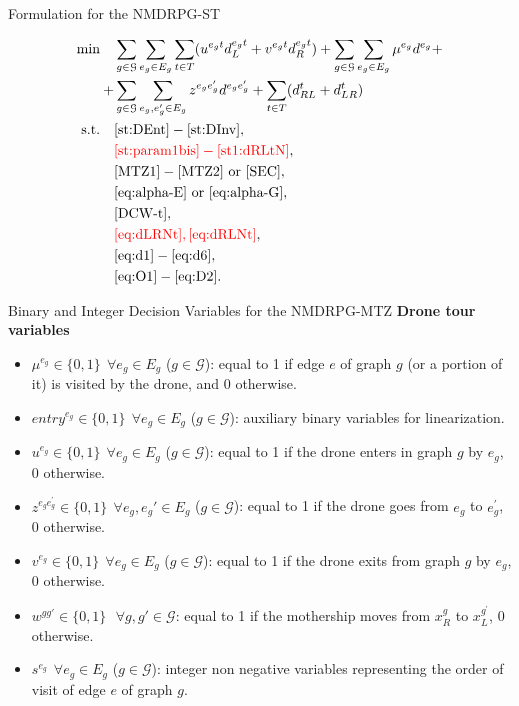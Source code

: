 \documentclass[slidestop,usepdftitle=false,10pt]{beamer}
\begin{document}
	\begin{frame}{Formulation for the NMDRPG-ST}
	
	\begin{align*}
	    \text{min}\quad &\sum_{g\in\mathcal G}\sum_{e_g\in E_g}\sum_{t\in T} (u^{e_gt}d_L^{e_gt} + v^{e_gt}d_R^{e_gt}) + \sum_{g\in\mathcal G}\sum_{e_g\in E_g} \mu^{e_g}d^{e_g} + \\
	    + & \sum_{g\in\mathcal G}\sum_{e_g,e^\prime_g\in E_g}z^{e_ge^\prime_g}d^{e_ge^\prime_g} + \sum_{t\in T} (d_{RL}^t + d_{LR}^t) \\
	    \text{s.t.}\quad & \eqref{st:DEnt}-\eqref{st:DInv}, \\
	    & \textcolor{red}{\eqref{st:param1bis}-\eqref{st1:dRLtN}}, \\
	    & \eqref{MTZ1} - \eqref{MTZ2} \text{ or } \eqref{SEC}, \\
	    & \eqref{eq:alpha-E} \text{ or } \eqref{eq:alpha-G}, \\
	    & \eqref{DCW-t}, \\
	    & \textcolor{red}{\eqref{eq:dLRNt}, \eqref{eq:dRLNt}}, \\
	    & \eqref{eq:d1}-\eqref{eq:d6}, \\
	    & \eqref{eq:O1}-\eqref{eq:D2}.
	\end{align*}
	    
	\end{frame}
	
	\begin{frame}{{\large Binary and Integer Decision Variables for the NMDRPG-MTZ}}
	\textbf{Drone tour variables}
	\begin{itemize}
	    \small
	    \item $\mu^{e_g} \in \{0,1\} \:\: \forall e_g \in E_g$ ($g \in \mathcal{G}$): equal to 1 if edge $e$ of graph $g$ (or a portion of it) is visited by the drone, and 0 otherwise.
        \item $entry^{e_g} \in \{0,1\} \:\: \forall e_g \in E_g$ ($g \in \mathcal{G}$): auxiliary binary variables for linearization.
        \item $u^{e_{g}} \in \{0,1\} \:\: \forall e_g \in E_g$ ($g \in \mathcal{G}$): equal to 1 if the drone enters in graph $g$ by $e_g$, 0 otherwise.
        \item $z^{e_{g}e^{'}_{g}} \in \{0,1\} \:\: \forall e_g, e_g' \in E_g$ ($g \in \mathcal{G}$): equal to 1 if the drone goes from $e_g$ to $e^{'}_{g}$, 0 otherwise.
        \item $v^{e_{g}} \in \{0,1\} \:\: \forall e_g \in E_g$ ($g \in \mathcal{G}$): equal to 1 if the drone exits from graph $g$ by $e_g$, 0 otherwise.
        \item $w^{gg'} \in \{0,1\} \:\:\ \forall g,g' \in \mathcal{G}$: equal to 1 if the mothership moves from $x_R^g$ to $x_L^{g^'}$, 0 otherwise.
        \item $s^{e_g} \:\: \forall e_g \in E_g$ ($g \in \mathcal{G}$): integer non negative variables representing the order of visit of edge $e$ of graph $g$.
    \end{itemize}
    \end{frame}
    
\end{document}
